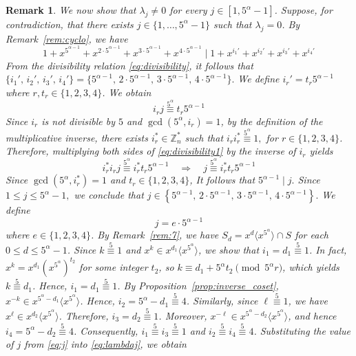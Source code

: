 \documentclass[12pt]{article}
\newtheorem{remA}[propA]{Remark}
\begin{document}
\begin{remA}
 We now show that $\lambda_j\neq0$ for every $j\in[1,5^\alpha-1]$. Suppose, for contradiction, that there exists $j\in\{1,\ldots,5^\alpha-1\}$ such that $\lambda_j=0$. By Remark~\ref{rem:cyclo}, we have
\begin{equation}\label{eq:divisibility}
1+x^{5^{\alpha-1}}+x^{2\cdot5^{\alpha-1}}+x^{3\cdot5^{\alpha-1}}+x^{4\cdot5^{\alpha-1}} \mid
1+x^{i_1'}+x^{i_2'}+x^{i_3'}+x^{i_4'}
\end{equation}
From the divisibility relation \eqref{eq:divisibility}, it follows that
 $
  \{i_1',\,i_2',\,i_3',\,i_4'\}=\{5^{\alpha-1},\,2\cdot5^{\alpha-1},\,3\cdot5^{\alpha-1},\,4\cdot5^{\alpha-1}\}.
 $ We define $i_r'=t_r5^{\alpha-1}$
 where $r,t_r\in\{1,2,3,4\}$. We obtain
 \begin{equation}\label{eq:divisibility1}
  i_r j \overset{5^\alpha}{\equiv} t_r 5^{\alpha-1}
 \end{equation}	
 Since $i_r$ is not divisible by $5$ and $\gcd(5^\alpha,i_r)=1$, by the definition of the multiplicative inverse, there exists $i_r^{*}\in\mathbb{Z}_{n}^{*}$ such that
 $
i_r i_r^{*}\overset{5^\alpha}{\equiv} 1 ,
 $
 for $r\in\{1,2,3,4\}$. Therefore, multiplying both sides of \eqref{eq:divisibility1} by the inverse of $i_r$ yields
 \[
 i_r^{*} i_r j \overset{5^\alpha}{\equiv}i_r^{*}  t_r 5^{\alpha-1}
\quad\Longrightarrow\quad
j \overset{5^\alpha}{\equiv}i_r^{*}
  t_r 5^{\alpha-1}
 \]
 Since $\gcd(5^\alpha,i_r^{*})=1$ and $t_r\in\{1,2,3,4\}$, It follows that
 $
 5^{\alpha-1}\mid j.
 $
 Since
 $
 1\le j\le 5^\alpha-1,
 $
 we conclude that
 $
 j\in\left\{5^{\alpha-1},\,2\cdot5^{\alpha-1},\,3\cdot5^{\alpha-1},\,4\cdot5^{\alpha-1}\right\}.
 $
 We define
 \begin{equation}\label{eq:j}
 	j=e \cdot 5^{\alpha-1}
 \end{equation}
 where $e\in\{1,2,3,4\}$.
By Remark~\ref{rem:7}, we have $S_d=x^d\langle x^{5^\alpha}\rangle\cap S$ for each $0\le d\le 5^\alpha-1$. Since $k\stackrel{5}{\equiv}1$ and $x^k\in x^{d_1}\langle x^{5^\alpha}\rangle$, we show that $i_1=d_1\stackrel{5}{\equiv}1$. In fact, $x^k=x^{d_1}\left(x^{5^\alpha}\right)^{t_2}$ for some integer $t_2$, so $k\equiv d_1+5^\alpha t_2\pmod{5^\alpha r}$, which yields $k\stackrel{5}{\equiv}d_1$. Hence, $i_1=d_1\stackrel{5}{\equiv}1$. By Proposition~\ref{prop:inverse_coset}, $x^{-k}\in x^{5^\alpha-d_1}\langle x^{5^\alpha}\rangle$. Hence, $i_2=5^\alpha-d_1\stackrel{5}{\equiv}4$. Similarly, since $\ell\stackrel{5}{\equiv}1$, we have $x^{\ell}\in x^{d_2}\langle x^{5^\alpha}\rangle$. Therefore, $i_3=d_2\stackrel{5}{\equiv}1$. Moreover, $x^{-\ell}\in x^{5^\alpha-d_2}\langle x^{5^\alpha}\rangle$, and hence $i_4=5^\alpha-d_2\stackrel{5}{\equiv}4$. Consequently, $i_1\stackrel{5}{\equiv}i_3\stackrel{5}{\equiv}1$ and $i_2\stackrel{5}{\equiv}i_4\stackrel{5}{\equiv}4$. Substituting the value of $j$ from \eqref{eq:j} into \eqref{eq:lambdaj}, we obtain


\end{remA}
\end{document}
